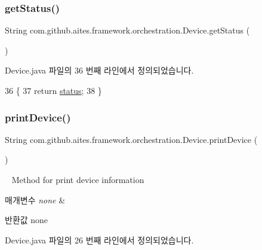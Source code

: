 \subsubsection{\texorpdfstring{get\+Status()}{getStatus()}}
{\footnotesize\ttfamily String com.\+github.\+aites.\+framework.\+orchestration.\+Device.\+get\+Status (\begin{DoxyParamCaption}{ }\end{DoxyParamCaption})}



Device.\+java 파일의 36 번째 라인에서 정의되었습니다.


\begin{DoxyCode}
36                              \{
37         \textcolor{keywordflow}{return} \mbox{\hyperlink{classcom_1_1github_1_1aites_1_1framework_1_1orchestration_1_1_device_abe5c31f96d08c3caf2085af43d59cf6f}{status}};
38     \}
\end{DoxyCode}
\mbox{\label{classcom_1_1github_1_1aites_1_1framework_1_1orchestration_1_1_device_a97282a5052fb7a86da83b10db1958d55}} 
\subsubsection{\texorpdfstring{print\+Device()}{printDevice()}}
{\footnotesize\ttfamily String com.\+github.\+aites.\+framework.\+orchestration.\+Device.\+print\+Device (\begin{DoxyParamCaption}{ }\end{DoxyParamCaption})}



~\newline
Method for print device information 


\begin{DoxyParams}{매개변수}
{\em none} & \\
\hline
\end{DoxyParams}
\begin{DoxyReturn}{반환값}
none 
\end{DoxyReturn}


Device.\+java 파일의 26 번째 라인에서 정의되었습니다.


